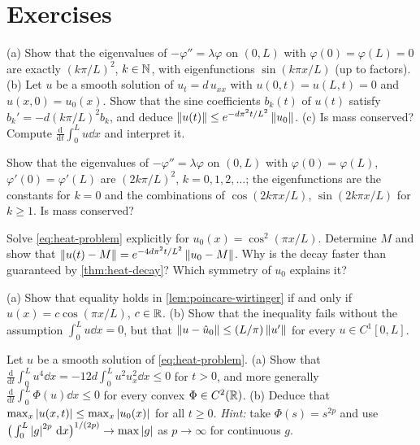 \section{Exercises}\label{sec:diffusion-exercises}

\begin{exercise}\label{exer:diffusion-dirichlet}
(a) Show that the eigenvalues of $-\varphi''=\lambda\varphi$ on $(0,L)$ with
$\varphi(0)=\varphi(L)=0$ are exactly $(k\pi/L)^2$, $k\in\mathbb{N}$, with eigenfunctions
$\sin(k\pi x/L)$ (up to factors). (b) Let $u$ be a smooth solution of
$u_t=d\,u_{xx}$ with $u(0,t)=u(L,t)=0$ and $u(x,0)=u_0(x)$. Show that the sine
coefficients $b_k(t)$ of $u(t)$ satisfy $b_k'=-d(k\pi/L)^2b_k$, and deduce
$\left\lVert u(t)\right\rVert\le e^{-d\pi^2t/L^2}\left\lVert u_0\right\rVert$. (c) Is mass conserved? Compute
$\frac{\mathrm d}{\mathrm dt}\int_0^Lu\dd x$ and interpret it.
\end{exercise}

\begin{exercise}\label{exer:diffusion-periodic}
Show that the eigenvalues of $-\varphi''=\lambda\varphi$ on $(0,L)$ with
$\varphi(0)=\varphi(L)$, $\varphi'(0)=\varphi'(L)$ are $(2k\pi/L)^2$,
$k=0,1,2,\dots$; the eigenfunctions are the constants for $k=0$ and the
combinations of $\cos(2k\pi x/L)$, $\sin(2k\pi x/L)$ for $k\ge1$. Is mass conserved?
\end{exercise}

\begin{exercise}\label{exer:diffusion-cos2}
Solve \eqref{eq:heat-problem} explicitly for $u_0(x)=\cos^2(\pi x/L)$. Determine $M$
and show that $\left\lVert u(t)-M\right\rVert=e^{-4d\pi^2t/L^2}\left\lVert u_0-M\right\rVert$. Why is the decay faster
than guaranteed by \cref{thm:heat-decay}? Which symmetry of $u_0$ explains it?
\end{exercise}

\begin{exercise}\label{exer:diffusion-poincare}
(a) Show that equality holds in \cref{lem:poincare-wirtinger} if and only if
$u(x)=c\cos(\pi x/L)$, $c\in\mathbb{R}$. (b) Show that the inequality fails without the
assumption $\int_0^Lu\dd x=0$, but that $\left\lVert u-\hat u_0\right\rVert\le(L/\pi)\left\lVert u'\right\rVert$ for
every $u\in C^1[0,L]$.
\end{exercise}

\begin{exercise}[$\ast$]\label{exer:diffusion-max}
Let $u$ be a smooth solution of \eqref{eq:heat-problem}. (a) Show that
$\frac{\mathrm d}{\mathrm dt}\int_0^Lu^4\dd x=-12d\int_0^Lu^2u_x^2\dd x\le0$ for $t>0$,
and more generally $\frac{\mathrm d}{\mathrm dt}\int_0^L\Phi(u)\dd x\le0$ for every
convex $\Phi\in C^2(\mathbb{R})$. (b) Deduce that
$\max_x\left\lvert u(x,t)\right\rvert\le\max_x\left\lvert u_0(x)\right\rvert$ for all $t\ge0$. \emph{Hint:} take
$\Phi(s)=s^{2p}$ and use $\big(\int_0^L\left\lvert g\right\rvert^{2p}\,\mathrm{d} x\big)^{1/(2p)}\to\max\left\lvert g\right\rvert$
as $p\to\infty$ for continuous $g$.
\end{exercise}
